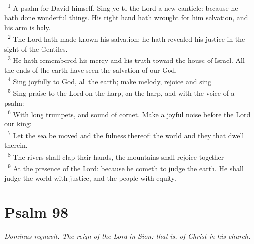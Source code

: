 \documentclass[a5paper,12pt]{article}
\begin{document}
\begin{multicols*}{2}
~\textsuperscript{1} A psalm for David himself. Sing ye to the Lord a new canticle: because he hath done wonderful things. His right hand hath wrought for him salvation, and his arm is holy.\\
~\textsuperscript{2} The Lord hath made known his salvation: he hath revealed his justice in the sight of the Gentiles.\\
~\textsuperscript{3} He hath remembered his mercy and his truth toward the house of Israel. All the ends of the earth have seen the salvation of our God.\\
~\textsuperscript{4} Sing joyfully to God, all the earth; make melody, rejoice and sing.\\
~\textsuperscript{5} Sing praise to the Lord on the harp, on the harp, and with the voice of a psalm:\\
~\textsuperscript{6} With long trumpets, and sound of cornet. Make a joyful noise before the Lord our king:\\
~\textsuperscript{7} Let the sea be moved and the fulness thereof: the world and they that dwell therein.\\
~\textsuperscript{8} The rivers shall clap their hands, the mountains shall rejoice together\\
~\textsuperscript{9} At the presence of the Lord: because he cometh to judge the earth. He shall judge the world with justice, and the people with equity.\\

\section{Psalm 98}
\label{sec:org126a4f6}
\emph{Dominus regnavit. The reign of the Lord in Sion: that is, of Christ in his church.}\\


\end{multicols*}
\end{document}
